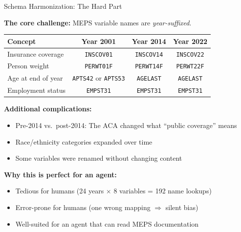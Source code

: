 \documentclass[10pt,english,aspectratio=169]{beamer}
\begin{document}
\begin{frame}{Schema Harmonization: The Hard Part}

\textbf{The core challenge:} MEPS variable names are \emph{year-suffixed}.

\vspace{0.3cm}
\begin{small}
\begin{tabular}{lccc}
\toprule
\textbf{Concept} & \textbf{Year 2001} & \textbf{Year 2014} & \textbf{Year 2022} \\
\midrule
Insurance coverage & \texttt{INSCOV01} & \texttt{INSCOV14} & \texttt{INSCOV22} \\
Person weight & \texttt{PERWT01F} & \texttt{PERWT14F} & \texttt{PERWT22F} \\
Age at end of year & \texttt{APTS42} or \texttt{APTS53} & \texttt{AGELAST} & \texttt{AGELAST} \\
Employment status & \texttt{EMPST31} & \texttt{EMPST31} & \texttt{EMPST31} \\
\bottomrule
\end{tabular}
\end{small}

\vspace{0.3cm}
\textbf{Additional complications:}
\begin{itemize}
    \item Pre-2014 vs.\ post-2014: The ACA changed what ``public coverage'' means
    \item Race/ethnicity categories expanded over time
    \item Some variables were renamed without changing content
\end{itemize}

\vspace{0.3cm}
\textbf{Why this is perfect for an agent:}
\begin{itemize}
    \item Tedious for humans (24 years $\times$ 8 variables = 192 name lookups)
    \item Error-prone for humans (one wrong mapping $\Rightarrow$ silent bias)
    \item Well-suited for an agent that can read MEPS documentation
\end{itemize}

\end{frame}
\end{document}
